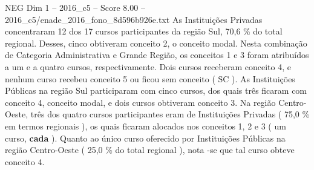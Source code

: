 \begin{textsample}{NEG Dim 1 – 2016\_c5 – Score 8.00 – 2016\_c5/enade\_2016\_fono\_8d596b926e.txt}
As Instituições Privadas concentraram 12 dos 17 cursos participantes da região Sul, 70,6 \% do total regional.
Desses, cinco obtiveram conceito 2, o conceito modal.
Nesta combinação de Categoria Administrativa e Grande Região, os conceitos 1 e 3 foram atribuídos a um e a quatro cursos, respectivamente.
Dois cursos receberam conceito 4, e nenhum curso recebeu conceito 5 ou ficou sem conceito ( SC ).
As Instituições Públicas na região Sul participaram com cinco cursos, dos quais três ficaram com conceito 4, conceito modal, e dois cursos obtiveram conceito 3.
Na região Centro-Oeste, três dos quatro cursos participantes eram de Instituições Privadas ( 75,0 \% em termos regionais ), os quais ficaram alocados nos conceitos 1, 2 e 3 ( um curso, \textbf{cada} ).
Quanto ao único curso oferecido por Instituições Públicas na região Centro-Oeste ( 25,0 \% do total regional ), nota -se que tal curso obteve conceito 4.

\end{textsample}

